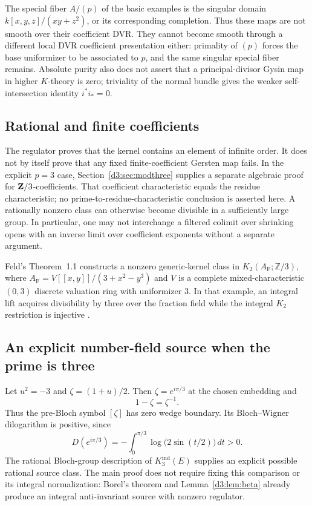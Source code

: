 The special fiber $A/(p)$ of the basic examples is the singular domain $k[x,y,z]/(xy+z^2)$, or its corresponding completion. Thus these maps are not smooth over their coefficient DVR. They cannot become smooth through a different local DVR coefficient presentation either: primality of $(p)$ forces the base uniformizer to be associated to $p$, and the same singular special fiber remains. Absolute purity also does not assert that a principal-divisor Gysin map in higher $K$-theory is zero; triviality of the normal bundle gives the weaker self-intersection identity $i^*i_*=0$.

\subsection{Rational and finite coefficients}
The regulator proves that the kernel contains an element of infinite order. It does not by itself prove that any fixed finite-coefficient Gersten map fails. In the explicit $p=3$ case, Section~\ref{d3:sec:modthree} supplies a separate algebraic proof for $\mathbf Z/3$-coefficients. That coefficient characteristic equals the residue characteristic; no prime-to-residue-characteristic conclusion is asserted here. A rationally nonzero class can otherwise become divisible in a sufficiently large group. In particular, one may not interchange a filtered colimit over shrinking opens with an inverse limit over coefficient exponents without a separate argument.

Feld's Theorem~1.1 \cite{FeldFiniteGersten2026} constructs a nonzero
generic-kernel class in $K_2(A_{\mathrm F};\mathbb{Z}/3)$, where
$A_{\mathrm F}=V[[x,y]]/(3+x^2-y^3)$ and $V$ is a complete mixed-characteristic
$(0,3)$ discrete valuation ring with uniformizer $3$.
In that example, an integral lift acquires divisibility by three over
the fraction field while the integral $K_2$ restriction is injective
\cite[Corollary~5.1]{FeldFiniteGersten2026}.

\subsection{An explicit number-field source when the prime is three}
Let $u^2=-3$ and $\zeta=(1+u)/2$. Then $\zeta=e^{i\pi/3}$ at the chosen embedding and
\[
1-\zeta=\zeta^{-1}.
\]
Thus the pre-Bloch symbol $[\zeta]$ has zero wedge boundary. Its Bloch--Wigner dilogarithm is positive, since
\[
D(e^{i\pi/3})=-\int_0^{\pi/3}\log\bigl(2\sin(t/2)\bigr)\,dt>0.
\]
The rational Bloch-group description of $K_3^{\mathrm{ind}}(E)$ \cite[VI, Theorem~5.2]{Weibel} supplies an explicit possible rational source class. The main proof does not require fixing this comparison or its integral normalization: Borel's theorem and Lemma~\ref{d3:lem:beta} already produce an integral anti-invariant source with nonzero regulator.

